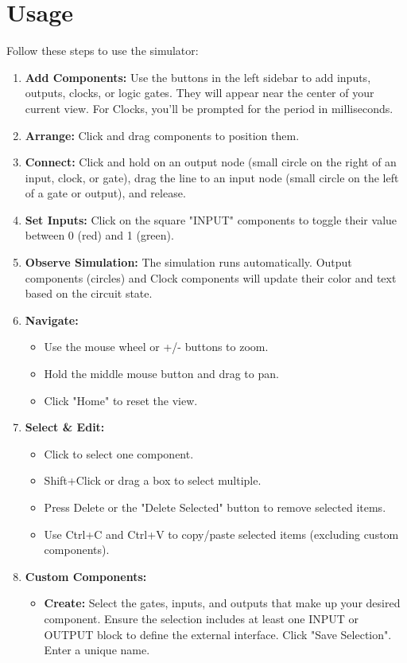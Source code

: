 \documentclass[11pt, a4paper]{article}
\begin{document}
\section{Usage}
Follow these steps to use the simulator:
\begin{enumerate}[leftmargin=*]
    \item \textbf{Add Components:} Use the buttons in the left sidebar to add inputs, outputs, clocks, or logic gates. They will appear near the center of your current view. For Clocks, you'll be prompted for the period in milliseconds.
    \item \textbf{Arrange:} Click and drag components to position them.
    \item \textbf{Connect:} Click and hold on an output node (small circle on the right of an input, clock, or gate), drag the line to an input node (small circle on the left of a gate or output), and release.
    \item \textbf{Set Inputs:} Click on the square "INPUT" components to toggle their value between 0 (red) and 1 (green).
    \item \textbf{Observe Simulation:} The simulation runs automatically. Output components (circles) and Clock components will update their color and text based on the circuit state.
    \item \textbf{Navigate:}
    \begin{itemize}
        \item Use the mouse wheel or +/- buttons to zoom.
        \item Hold the middle mouse button and drag to pan.
        \item Click "Home" to reset the view.
    \end{itemize}
    \item \textbf{Select & Edit:}
    \begin{itemize}
        \item Click to select one component.
        \item Shift+Click or drag a box to select multiple.
        \item Press Delete or the "Delete Selected" button to remove selected items.
        \item Use Ctrl+C and Ctrl+V to copy/paste selected items (excluding custom components).
    \end{itemize}
    \item \textbf{Custom Components:}
    \begin{itemize}
        \item \textbf{Create:} Select the gates, inputs, and outputs that make up your desired component. Ensure the selection includes at least one INPUT or OUTPUT block to define the external interface. Click "Save Selection". Enter a unique name.

\end{itemize}
\end{enumerate}
\end{document}
